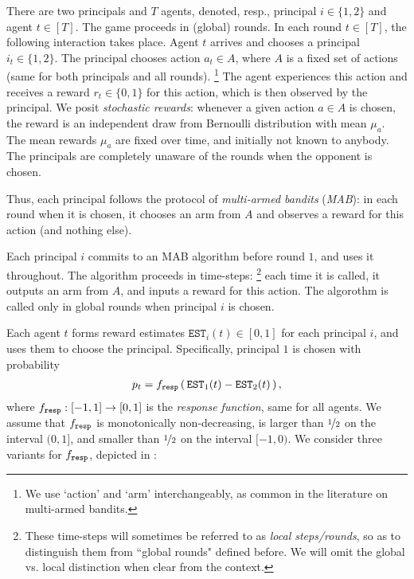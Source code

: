  There are two principals and $T$ agents,
denoted, resp., principal $i\in \{1,2\}$ and agent $t\in [T]$. The game proceeds in (global) rounds. In each round $t\in [T]$, the following  interaction takes place. Agent $t$ arrives and chooses a principal $i_t\in \{1,2\}$. The principal chooses action $a_t\in A$, where $A$ is a fixed set of actions (same for both principals and all rounds).%
\footnote{We use `action' and `arm' interchangeably, as common in the literature on multi-armed bandits.}
The agent experiences this action and receives a reward $r_t\in \{ 0,1\}$ for this action, which is then observed by the principal. We posit \emph{stochastic rewards}: whenever a given action $a\in A$ is chosen, the reward is an independent draw from Bernoulli distribution with mean $\mu_a$. The mean rewards $\mu_a$ are fixed over time, and initially not known to anybody. The principals are completely unaware of the rounds when the opponent is chosen.

Thus, each principal follows the protocol of \emph{multi-armed bandits} (\emph{MAB}): in each round when it is chosen, it chooses an arm from $A$ and observes a reward for this action (and nothing else).

Each principal $i$ commits to an MAB algorithm \alg[i] before round $1$, and uses it throughout. The algorithm proceeds in time-steps:%
\footnote{These time-steps will sometimes be referred to as \emph{local steps/rounds}, so as to distinguish them from ``global rounds" defined before. We will omit the global vs. local distinction when clear from the context.} each time it is called, it outputs an arm from $A$, and inputs a reward for this action. The algorothm is called only in global rounds when principal $i$ is chosen.

\newcommand{\est}{\mathtt{EST}}


 Each agent $t$ forms reward estimates $\est_i(t)\in [0,1]$ for each principal $i$, and uses them to choose the principal. Specifically, principal $1$ is chosen with probability
\begin{align}\label{eq:model-f}
p_t = \respF\rbr{ \est_1(t) - \est_2(t) },
\end{align}
where $f_{\mathtt{resp}}:[-1,1]\to [0,1]$ is the \emph{response function}, same for all agents. We assume that $f_{\mathtt{resp}}$ is monotonically non-decreasing, is larger than $\nicefrac12$ on the interval $(0,1]$, and smaller than $\nicefrac12$ on the interval $[-1,0)$. We consider three variants for $f_{\mathtt{resp}}$, depicted in  :

